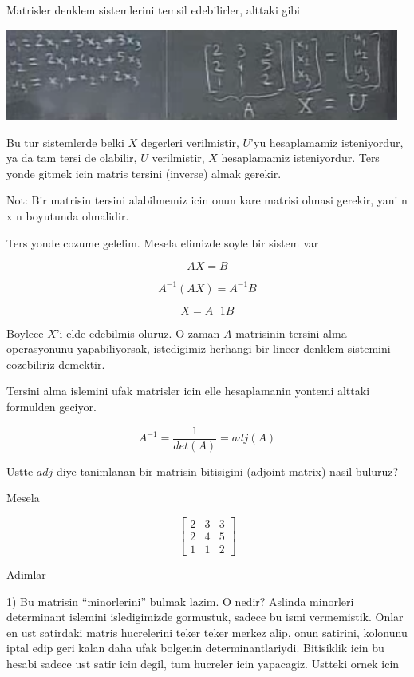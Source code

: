 \documentclass[12pt,fleqn]{article}
\begin{document}
Matrisler denklem sistemlerini temsil edebilirler, alttaki gibi

\includegraphics[height=3cm]{3_5.png}

Bu tur sistemlerde belki $X$ degerleri verilmistir, $U$'yu hesaplamamiz
isteniyordur, ya da tam tersi de olabilir, $U$ verilmistir, $X$
hesaplamamiz isteniyordur. Ters yonde gitmek icin matris tersini (inverse)
almak gerekir.

Not: Bir matrisin tersini alabilmemiz icin onun kare matrisi olmasi gerekir,
yani n x n boyutunda olmalidir. 

Ters yonde cozume gelelim. Mesela elimizde soyle bir sistem var

\[  AX = B\]

\[  A^{-1}(AX) = A^{-1}B\]

\[  X = A^{-}1B\]

Boylece $X$'i elde edebilmis oluruz. O zaman $A$ matrisinin tersini alma
operasyonunu yapabiliyorsak, istedigimiz herhangi bir lineer denklem
sistemini cozebiliriz demektir. 

Tersini alma islemini ufak matrisler icin elle hesaplamanin yontemi alttaki
formulden geciyor. 

\[ A^{-1} = \frac{1}{det(A)}  = adj(A)\]

Ustte $adj$ diye tanimlanan bir matrisin bitisigini (adjoint matrix) nasil
buluruz?

Mesela

\[ 
\left[\begin{array}{rrr}
2 & 3 & 3 \\
2 & 4 & 5 \\
1 & 1 & 2
\end{array}\right]
 \]

Adimlar

1) Bu matrisin ``minorlerini'' bulmak lazim. O nedir? Aslinda minorleri
determinant islemini isledigimizde gormustuk, sadece bu ismi vermemistik.
Onlar en ust satirdaki matris hucrelerini teker teker merkez alip, onun
satirini, kolonunu iptal edip geri kalan daha ufak bolgenin
determinantlariydi. Bitisiklik icin bu hesabi sadece ust satir icin degil,
tum hucreler icin yapacagiz. Ustteki ornek icin
\end{document}
